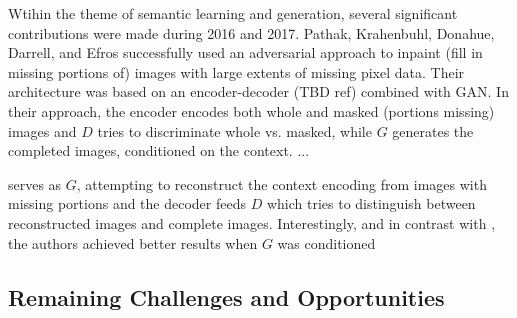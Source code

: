 \documentclass[11pt]{article}
\begin{document}
Wtihin the theme of semantic learning and generation, several significant contributions were made during 2016 and 2017.  Pathak, Krahenbuhl, Donahue, Darrell, and Efros successfully used an adversarial approach to inpaint (fill in missing portions of) images with large extents of missing pixel data.  Their architecture was based on an encoder-decoder (TBD ref) combined with GAN.  In their approach, the encoder encodes both whole and masked (portions missing) images and $D$ tries to discriminate whole vs. masked, while $G$ generates the completed images, conditioned on the context. ...

 serves as $G$, attempting to reconstruct the context encoding from images with missing portions and the decoder feeds $D$ which tries to distinguish between reconstructed images and complete images.  Interestingly, and in contrast with \cite{mirza2014conditional}, the authors achieved better results when $G$ was conditioned




\subsection{Remaining Challenges and Opportunities}
\end{document}
